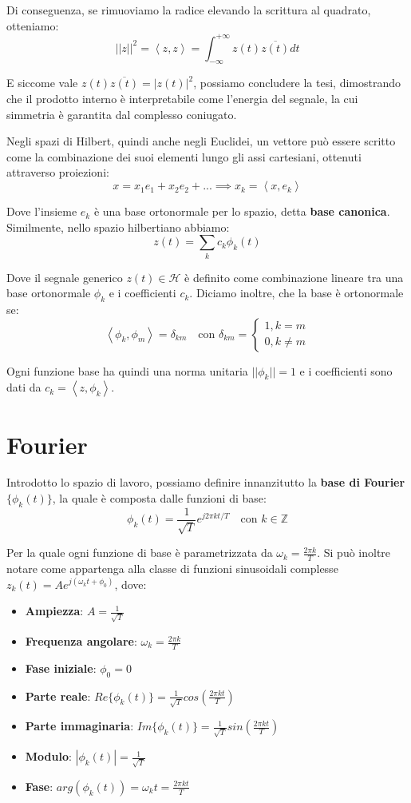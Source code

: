 \noindent Di conseguenza, se rimuoviamo la radice elevando la scrittura al quadrato, otteniamo: \[
    ||z||^2 = \left<z, z \right> = \int_{-\infty}^{+\infty} z(t)\overline{z(t)} dt
\]

\noindent E siccome vale $z(t)\overline{z(t)} = |z(t)|^2$, possiamo concludere la tesi, dimostrando che il prodotto interno è interpretabile come
l'energia del segnale, la cui simmetria è garantita dal complesso coniugato.\par
Negli spazi di Hilbert, quindi anche negli Euclidei, un vettore può essere scritto come la combinazione dei suoi elementi lungo gli assi cartesiani,
ottenuti attraverso proiezioni: \[
    x = x_1e_1 + x_2e_2 + ... \implies x_k = \left< x, e_k\right>
\]

\noindent Dove l'insieme $e_k$ è una base ortonormale per lo spazio, detta \textbf{base canonica}. Similmente, nello spazio hilbertiano abbiamo: \[
    z(t) = \sum_{k}c_k\phi_k(t)
\]

\noindent Dove il segnale generico $z(t)\in \mathcal{H}$ è definito come combinazione lineare tra una base ortonormale $\phi_k$ e i coefficienti $c_k$.
Diciamo inoltre, che la base è ortonormale se: \[
    \left<\phi_k, \phi_m \right> = \delta_{km}\quad \text{con } \delta_{km} = \begin{cases}
        1, k=m\\
        0, k\neq m
    \end{cases}
\]

\noindent Ogni funzione base ha quindi una norma unitaria $||\phi_k|| = 1$ e i coefficienti sono dati da $c_k = \left<z, \phi_k \right>$.

%

\section{Fourier}
Introdotto lo spazio di lavoro, possiamo definire innanzitutto la \textbf{base di Fourier} $\{\phi_k(t)\}$, la quale è composta dalle funzioni di base:
\[
    \phi_k(t) = \frac{1}{\sqrt{T}}e^{j2\pi kt/T}\quad \text{con }k\in\mathbb{Z}
\]

\noindent Per la quale ogni funzione di base è parametrizzata da $\omega_k = \frac{2\pi k}{T}$. Si può inoltre notare come appartenga alla classe di
funzioni sinusoidali complesse $z_k(t) = Ae^{j(\omega_kt+\phi_0)}$, dove: \begin{itemize}
    \item \textbf{Ampiezza}: $A = \frac{1}{\sqrt{T}}$
    \item \textbf{Frequenza angolare}: $\omega_k = \frac{2\pi k}{T}$
    \item \textbf{Fase iniziale}: $\phi_0 = 0$
    \item \textbf{Parte reale}: $Re\{\phi_k(t)\} = \frac{1}{\sqrt{T}}cos\left(\frac{2\pi kt}{T}\right)$
    \item \textbf{Parte immaginaria}: $Im\{\phi_k(t)\} = \frac{1}{\sqrt{T}}sin\left(\frac{2\pi kt}{T}\right)$
    \item \textbf{Modulo}: $|\phi_k(t)| = \frac{1}{\sqrt{T}}$
    \item \textbf{Fase}: $arg(\phi_k(t)) = \omega_kt = \frac{2\pi kt}{T}$
\end{itemize}

